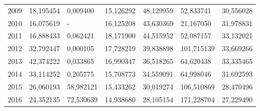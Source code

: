 \begin{table}
\begin{tabular}{p{1cm}p{2cm}p{2cm}p{2cm}p{2cm}p{2cm}p{2cm}}
 2009 &                       18,195454 &                                     0,009400 & 15,126292 &                                   48,129959 &            52,833741 &                           30,556028 \\
 2010 &                       16,075619 &                                            - & 16,125208 &                                   43,630369 &            21,167050 &                           31,978831 \\
 2011 &                       16,888433 &                                     0,062421 & 18,171900 &                                   44,515952 &            52,087157 &                           33,132021 \\
 2012 &                       32,792447 &                                     0,000105 & 17,728219 &                                   39,838898 &           101,715139 &                           33,669266 \\
 2013 &                       42,374222 &                                     0,033865 & 16,990347 &                                   36,518265 &            64,620438 &                           33,335465 \\
 2014 &                       33,114252 &                                     0,205775 & 15,708773 &                                   34,559091 &            64,998046 &                           31,692593 \\
 2015 &                       26,060193 &                                    58,982121 & 15,433262 &                                   30,019274 &           106,510869 &                           28,470496 \\
 2016 &                       24,352135 &                                    72,530639 & 14,938680 &                                   28,105154 &           171,228704 &                           27,229490 \\
\bottomrule
\end{tabular}
\end{table}
